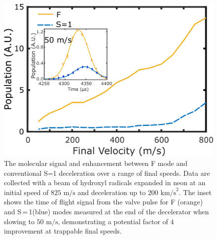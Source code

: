 \documentclass[%
 reprint,
 amsmath,amssymb,
 aps,
prl,
]{revtex4-1}
\begin{document}
\begin{figure}[t]
\includegraphics[width=\linewidth]{Figure3.png}%
\vspace{-5pt}
\caption{\label{fig:alldata}
The molecular signal and enhancement between F mode and conventional S=1 deceleration over a range of final speeds. 
Data are collected with a beam of hydroxyl radicals expanded in neon at an initial speed of $825 \text{ m/s}$ and deceleration up to $200 \text{ km/s}^2$. 
The inset shows the time of flight signal from the valve pulse for F (orange) and S\,=\,1(blue) modes measured at the end of the decelerator when slowing to $50 \text{ m/s}$, demonstrating a potential factor of $4$ improvement at trappable final speeds. 
\vspace{-4mm}}
\end{figure}
\end{document}
